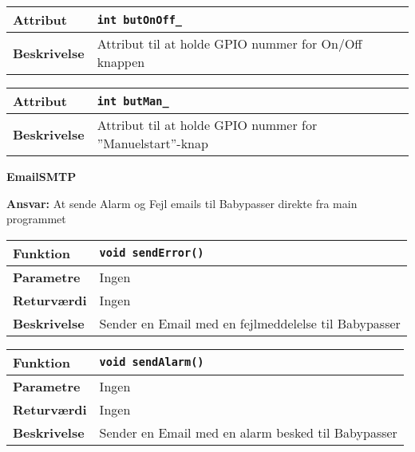 \begin{center}
    \begin{tabular}{ | l | p{} |}
    \hline
    \textbf{Attribut}		& \verb+int butOnOff_ +										\\ \hline
    \textbf{Beskrivelse} 	& Attribut til at holde GPIO nummer for On/Off knappen		\\ \hline
    \end{tabular}
\end{center}

\begin{center}
    \begin{tabular}{ | l | p{} |}
    \hline
    \textbf{Attribut}		& \verb+int butMan_ +											\\ \hline
    \textbf{Beskrivelse} 	& Attribut til at holde GPIO nummer for ''Manuelstart''-knap		\\ \hline
    \end{tabular}
\end{center}

{\centering
\textbf{EmailSMTP}\par
}
\textbf{Ansvar:} At sende Alarm og Fejl emails til Babypasser direkte fra main programmet \

\begin{center}
    \begin{tabular}{ | l | p{} |}
    \hline
    \textbf{Funktion}	& \verb+void sendError() +								\\ \hline
    \textbf{Parametre} 	& Ingen													\\ \hline
    \textbf{Returværdi}	& Ingen													\\ \hline
    \textbf{Beskrivelse}	& Sender en Email med en fejlmeddelelse til Babypasser	\\ \hline
    \end{tabular}
\end{center}

\begin{center}
    \begin{tabular}{ | l | p{} |}
    \hline
    \textbf{Funktion}	& \verb+void sendAlarm() +							\\ \hline
    \textbf{Parametre} 	& Ingen												\\ \hline
    \textbf{Returværdi}	& Ingen												\\ \hline
    \textbf{Beskrivelse}	& Sender en Email med en alarm besked til Babypasser	\\ \hline
    \end{tabular}
\end{center}

